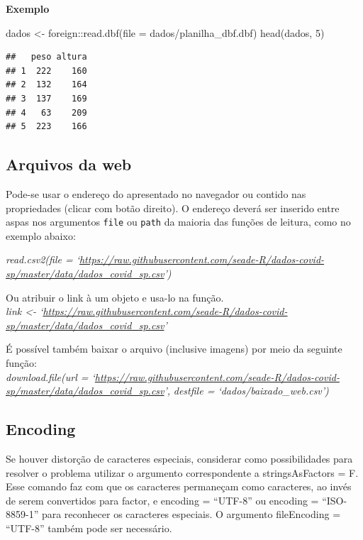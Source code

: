 \documentclass[
]{book}
\newenvironment{Shaded}{\begin{snugshade}}{\end{snugshade}}
\newcommand{\AttributeTok}[1]{\textcolor[rgb]{0.77,0.63,0.00}{#1}}
\newcommand{\DecValTok}[1]{\textcolor[rgb]{0.00,0.00,0.81}{#1}}
\newcommand{\FunctionTok}[1]{\textcolor[rgb]{0.00,0.00,0.00}{#1}}
\newcommand{\NormalTok}[1]{#1}
\newcommand{\OtherTok}[1]{\textcolor[rgb]{0.56,0.35,0.01}{#1}}
\newcommand{\SpecialCharTok}[1]{\textcolor[rgb]{0.00,0.00,0.00}{#1}}
\newcommand{\StringTok}[1]{\textcolor[rgb]{0.31,0.60,0.02}{#1}}
\theoremstyle{definition}
\theoremstyle{definition}
\theoremstyle{definition}
\theoremstyle{definition}
\theoremstyle{remark}
\begin{document}
\textbf{Exemplo}

\begin{Shaded}
\begin{Highlighting}[]
\NormalTok{dados }\OtherTok{\textless{}{-}}\NormalTok{ foreign}\SpecialCharTok{::}\FunctionTok{read.dbf}\NormalTok{(}\AttributeTok{file =} \StringTok{\textquotesingle{}dados/planilha\_dbf.dbf\textquotesingle{}}\NormalTok{)}
\FunctionTok{head}\NormalTok{(dados, }\DecValTok{5}\NormalTok{)}
\end{Highlighting}
\end{Shaded}

\begin{verbatim}
##   peso altura
## 1  222    160
## 2  132    164
## 3  137    169
## 4   63    209
## 5  223    166
\end{verbatim}

\hypertarget{arquivos-da-web}{%
\subsection{Arquivos da web}\label{arquivos-da-web}}

Pode-se usar o endereço do apresentado no navegador ou contido nas propriedades (clicar com botão direito). O endereço deverá ser inserido entre aspas nos argumentos \texttt{file} ou \texttt{path} da maioria das funções de leitura, como no exemplo abaixo:

\emph{read.csv2(file = `\url{https://raw.githubusercontent.com/seade-R/dados-covid-sp/master/data/dados_covid_sp.csv}')}

Ou atribuir o link à um objeto e usa-lo na função.\\
\emph{link \textless- `\url{https://raw.githubusercontent.com/seade-R/dados-covid-sp/master/data/dados_covid_sp.csv}'}

É possível também baixar o arquivo (inclusive imagens) por meio da seguinte função:\\
\emph{download.file(url = `\url{https://raw.githubusercontent.com/seade-R/dados-covid-sp/master/data/dados_covid_sp.csv}',}
\emph{destfile = `dados/baixado\_web.csv')}

\hypertarget{encoding}{%
\subsection{Encoding}\label{encoding}}

Se houver distorção de caracteres especiais, considerar como possibilidades para resolver o problema utilizar o argumento correspondente a stringsAsFactors = F. Esse comando faz com que os caracteres permaneçam como caracteres, ao invés de serem convertidos para factor, e encoding = ``UTF-8'' ou encoding = ``ISO-8859-1'' para reconhecer os caracteres especiais. O argumento fileEncoding = ``UTF-8'' também pode ser necessário.
\end{document}
